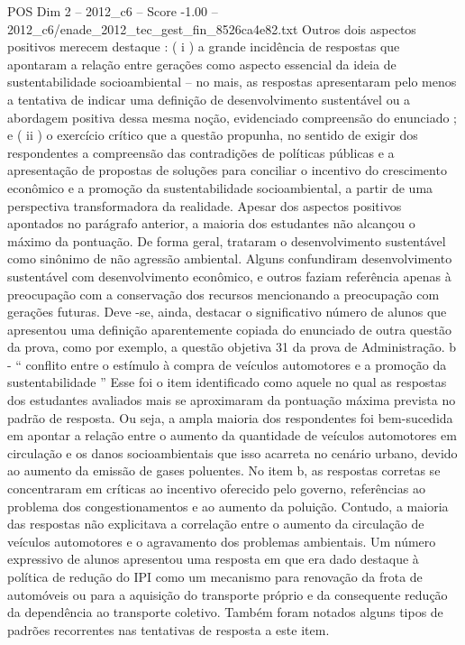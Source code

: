 \begin{textsample}{POS Dim 2 – 2012\_c6 – Score -1.00 – 2012\_c6/enade\_2012\_tec\_gest\_fin\_8526ca4e82.txt}
Outros dois aspectos positivos merecem destaque : ( i ) a grande incidência de respostas que apontaram a relação entre gerações como aspecto essencial da ideia de sustentabilidade socioambiental – no mais, as respostas apresentaram pelo menos a tentativa de indicar uma definição de desenvolvimento sustentável ou a abordagem positiva dessa mesma noção, evidenciado compreensão do enunciado ; e ( ii ) o exercício crítico que a questão propunha, no sentido de exigir dos respondentes a compreensão das contradições de políticas públicas e a apresentação de propostas de soluções para conciliar o incentivo do crescimento econômico e a promoção da sustentabilidade socioambiental, a partir de uma perspectiva transformadora da realidade.
Apesar dos aspectos positivos apontados no parágrafo anterior, a maioria dos estudantes não alcançou o máximo da pontuação.
De forma geral, trataram o desenvolvimento sustentável como sinônimo de não agressão ambiental.
Alguns confundiram desenvolvimento sustentável com desenvolvimento econômico, e outros faziam referência apenas à preocupação com a conservação dos recursos mencionando a preocupação com gerações futuras.
Deve -se, ainda, destacar o significativo número de alunos que apresentou uma definição aparentemente copiada do enunciado de outra questão da prova, como por exemplo, a questão objetiva 31 da prova de Administração. b - “ conflito entre o estímulo à compra de veículos automotores e a promoção da sustentabilidade ” Esse foi o item identificado como aquele no qual as respostas dos estudantes avaliados mais se aproximaram da pontuação máxima prevista no padrão de resposta.
Ou seja, a ampla maioria dos respondentes foi bem-sucedida em apontar a relação entre o aumento da quantidade de veículos automotores em circulação e os danos socioambientais que isso acarreta no cenário urbano, devido ao aumento da emissão de gases poluentes.
No item b, as respostas corretas se concentraram em críticas ao incentivo oferecido pelo governo, referências ao problema dos congestionamentos e ao aumento da poluição.
Contudo, a maioria das respostas não explicitava a correlação entre o aumento da circulação de veículos automotores e o agravamento dos problemas ambientais.
Um número expressivo de alunos apresentou uma resposta em que era dado destaque à política de redução do IPI como um mecanismo para renovação da frota de automóveis ou para a aquisição do transporte próprio e da consequente redução da dependência ao transporte coletivo.
Também foram notados alguns tipos de padrões recorrentes nas tentativas de resposta a este item.

\end{textsample}
